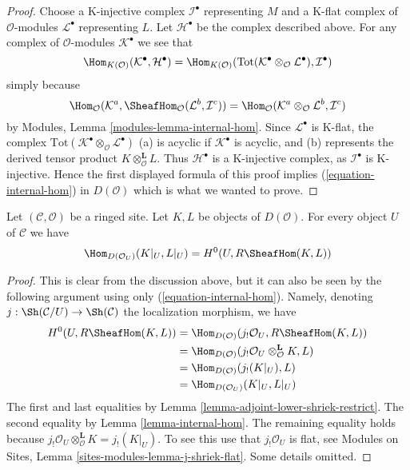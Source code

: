 \begin{proof}
Choose a K-injective complex $\mathcal{I}^\bullet$ representing
$M$ and a K-flat complex of $\mathcal{O}$-modules $\mathcal{L}^\bullet$
representing $L$. Let $\mathcal{H}^\bullet$ be the complex described above.
For any complex of $\mathcal{O}$-modules $\mathcal{K}^\bullet$ we see that
$$
\Hom_{K(\mathcal{O})}(\mathcal{K}^\bullet, \mathcal{H}^\bullet)
=
\Hom_{K(\mathcal{O})}(
\text{Tot}(\mathcal{K}^\bullet \otimes_\mathcal{O} \mathcal{L}^\bullet),
\mathcal{I}^\bullet)
$$
simply because
$$
\Hom_\mathcal{O}(
\mathcal{K}^a, \SheafHom_\mathcal{O}(\mathcal{L}^b, \mathcal{I}^c))
=
\Hom_\mathcal{O}(
\mathcal{K}^a \otimes_\mathcal{O} \mathcal{L}^b, \mathcal{I}^c)
$$
by Modules, Lemma \ref{modules-lemma-internal-hom}. Since $\mathcal{L}^\bullet$
is K-flat, the complex
$\text{Tot}(\mathcal{K}^\bullet \otimes_\mathcal{O} \mathcal{L}^\bullet)$
(a) is acyclic if $\mathcal{K}^\bullet$ is acyclic, and
(b) represents the derived tensor product
$K \otimes_\mathcal{O}^\mathbf{L} L$. Thus $\mathcal{H}^\bullet$
is a K-injective complex, as $\mathcal{I}^\bullet$ is K-injective.
Hence the first displayed formula of this proof implies
(\ref{equation-internal-hom})
in $D(\mathcal{O})$ which is what we wanted to prove.
\end{proof}

\begin{lemma}
\label{lemma-section-RHom-over-U}
Let $(\mathcal{C}, \mathcal{O})$ be a ringed site. Let $K, L$ be objects
of $D(\mathcal{O})$. For every object $U$ of $\mathcal{C}$ we have
$$
\Hom_{D(\mathcal{O}_U)}(K|_U, L|_U) =
H^0(U, R\SheafHom(K, L))
$$
\end{lemma}

\begin{proof}
This is clear from the discussion above, but it can also be seen by
the following argument using only (\ref{equation-internal-hom}).
Namely, denoting $j : \Sh(\mathcal{C}/U) \to \Sh(\mathcal{C})$ the localization
morphism, we have
\begin{align*}
H^0(U, R\SheafHom(K, L))
& =
\Hom_{D(\mathcal{O})}(j_!\mathcal{O}_U, R\SheafHom(K, L)) \\
& =
\Hom_{D(\mathcal{O})}(
j_!\mathcal{O}_U \otimes_\mathcal{O}^\mathbf{L} K, L) \\
& =
\Hom_{D(\mathcal{O})}(j_!(K|_U), L) \\
& =
\Hom_{D(\mathcal{O}_U)}(K|_U, L|_U)
\end{align*}
The first and last equalities by
Lemma \ref{lemma-adjoint-lower-shriek-restrict}.
The second equality by Lemma \ref{lemma-internal-hom}.
The remaining equality holds because
$j_!\mathcal{O}_U \otimes_\mathcal{O}^\mathbf{L} K = j_!(K|_U)$.
To see this use that $j_!\mathcal{O}_U$ is flat, see
Modules on Sites, Lemma \ref{sites-modules-lemma-j-shriek-flat}.
Some details omitted.
\end{proof}

